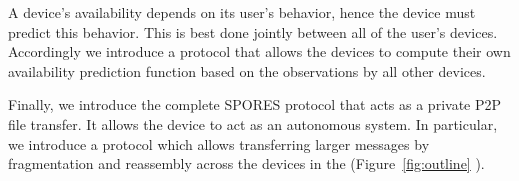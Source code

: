 A device's availability depends on its user's behavior, hence the device must 
predict this behavior. This is best done jointly between all of the user's devices.
Accordingly we introduce a protocol that allows the devices to 
compute their own availability prediction function based on the observations by 
all other devices.

Finally, we introduce the complete \ac{SPORES} protocol that acts as a private P2P file transfer. It 
allows the device \squad to act as an autonomous system.
In particular, we introduce a protocol which allows transferring larger 
messages by fragmentation and reassembly across the devices in the \squad  (Figure~\ref{fig:outline} ).
